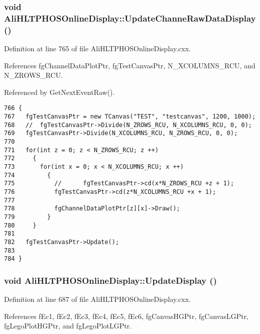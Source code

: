 \subsubsection{\setlength{\rightskip}{0pt plus 5cm}void Ali\-HLTPHOSOnline\-Display::Update\-Channe\-Raw\-Data\-Display ()}\label{classAliHLTPHOSOnlineDisplay_a7}




Definition at line 765 of file Ali\-HLTPHOSOnline\-Display.cxx.

References fg\-Channel\-Data\-Plot\-Ptr, fg\-Test\-Canvas\-Ptr, N\_\-XCOLUMNS\_\-RCU, and N\_\-ZROWS\_\-RCU.

Referenced by Get\-Next\-Event\-Raw().

\footnotesize\begin{verbatim}766 {
767   fgTestCanvasPtr = new TCanvas("TEST", "testcanvas", 1200, 1000);  
768   //  fgTestCanvasPtr->Divide(N_ZROWS_RCU, N_XCOLUMNS_RCU, 0, 0);
769   fgTestCanvasPtr->Divide(N_XCOLUMNS_RCU, N_ZROWS_RCU, 0, 0);
770 
771   for(int z = 0; z < N_ZROWS_RCU; z ++)
772     {
773       for(int x = 0; x < N_XCOLUMNS_RCU; x ++)
774         {
775           //      fgTestCanvasPtr->cd(x*N_ZROWS_RCU +z + 1);
776           fgTestCanvasPtr->cd(z*N_XCOLUMNS_RCU +x + 1);
777 
778           fgChannelDataPlotPtr[z][x]->Draw();
779         } 
780     }
781 
782   fgTestCanvasPtr->Update();
783 
784 }
\end{verbatim}\normalsize 


\subsubsection{\setlength{\rightskip}{0pt plus 5cm}void Ali\-HLTPHOSOnline\-Display::Update\-Display ()}\label{classAliHLTPHOSOnlineDisplay_a5}




Definition at line 687 of file Ali\-HLTPHOSOnline\-Display.cxx.

References f\-Ec1, f\-Ec2, f\-Ec3, f\-Ec4, f\-Ec5, f\-Ec6, fg\-Canvas\-HGPtr, fg\-Canvas\-LGPtr, fg\-Lego\-Plot\-HGPtr, and fg\-Lego\-Plot\-LGPtr.

